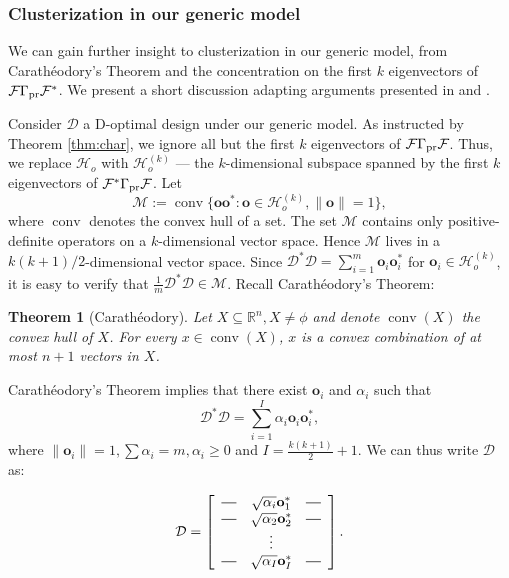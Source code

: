 \documentclass[ba]{imsart}
\newcommand*{\horzbar}{\rule[.5ex]{2.5ex}{0.5pt}}
\newcommand{\hilo}{\mathcal{H}_o}
\newcommand{\fwd}{\mathcal{F}}
\DeclareMathOperator*{\conv}{conv}
\newcommand{\meas}{\mathbf{o}}
\newcommand{\opt}{\mathcal{D}}
\theoremstyle{plain}
\newtheorem*{theorem*}{Theorem}
\theoremstyle{definition}
\theoremstyle{remark}
\begin{document}
\subsubsection{Clusterization in our generic model}\label{subsub:cara}
We can gain further insight to clusterization in our generic model,
from Carath\'eodory's Theorem and the concentration on the first $k$
eigenvectors of $\fwd \prcov \fwd^*$. We present a short discussion
adapting arguments presented in \cite[Chapter 3]{silvey1980} and
\cite[Section 5.2.3]{pronzatoPazman2013}.

Consider $\opt$ a D-optimal design under our generic model.  As
instructed by Theorem \ref{thm:char}, we ignore all but the first $k$
eigenvectors of $\fwd \prcov \fwd$. Thus, we replace $\hilo$ with
$\hilo^{(k)}$ --- the $k$-dimensional subspace spanned by the first
$k$ eigenvectors of $\fwd^*\prcov\fwd$. Let
\begin{equation*}
  \mathcal{M} := \conv \{\meas \meas^* : \meas\in \hilo^{(k)}, \|\meas\|=1\},
\end{equation*}
where $\conv$ denotes the convex hull of a set. The set $\mathcal{M}$
contains only positive-definite operators on a $k$-dimensional vector
space. Hence $\mathcal{M}$ lives in a $k(k+1)/2$-dimensional vector
space. Since $\opt^*\opt = \sum_{i=1}^m \meas_i\meas_i^*$ for $\meas_i
\in \hilo^{(k)}$, it is easy to verify that $\frac1m \opt^*\opt \in
\mathcal{M}$.  Recall Carath\'eodory's Theorem:
\begin{theorem*}[Carath\'eodory]
  Let $X \subseteq \mathbb{R}^n, X \neq \phi$ and denote $\conv (X)$
  the convex hull of $X$. For every $x \in \conv (X)$, $x$ is a convex
  combination of at most $n+1$ vectors in $X$.
\end{theorem*}
Carath\'eodory's Theorem implies that there exist $\meas_i$ and
$\alpha_i$ such that
\begin{equation*}
  \opt^*\opt = \sum_{i=1}^I \alpha_i \meas_i\meas_i^*,
\end{equation*}
where $\|\meas_i\|=1, \sum\alpha_i = m, \alpha_i \geq 0$ and $I =
\frac{k(k+1)}{2} + 1$. We can thus write $\opt$ as:


\[
\opt =
\left[
  \begin{array}{ccc}
    \horzbar & \sqrt{\alpha_i} \meas^*_1 & \horzbar \\
    \horzbar & \sqrt{\alpha_2} \meas_2^* & \horzbar \\
             & \vdots    &          \\
    \horzbar & \sqrt{\alpha_I} \meas_I^* & \horzbar \\
  \end{array}
\right].
\]
\end{document}
